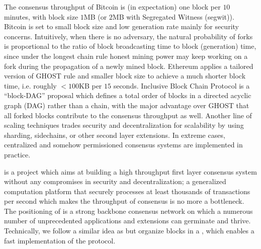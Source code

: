 \documentclass[fleqn,10pt]{SelfArx} %
\begin{document}
The consensus throughput of Bitcoin is (in expectation) one block per $10$ minutes, with block size $1$MB (or $2$MB with Segregated Witness (segwit)).
Bitcoin is set to small block size and low generation rate mainly for security concerns.
Intuitively, when there is no adversary, the natural probability of forks is proportional to the ratio of  block broadcasting time to block (generation) time,
since under the longest chain rule honest mining power may keep working on a fork during the propagation of a newly mined block.
Ethereum applies a tailored version of GHOST rule \cite{GHOST} and smaller block size to achieve a much shorter block time, i.e. roughly $<100$KB per $15$ seconds.
Inclusive Block Chain Protocol \cite{Inclusive} is a ``block-DAG'' proposal which defines a total order of blocks in a directed acyclic graph (DAG) rather than a chain, with the major advantage over GHOST that all forked blocks contribute to the consensus throughput as well. 
Another line of scaling techniques trades security and decentralization for scalability by using sharding, sidechains, or other second layer extensions.
In extreme cases, centralized and somehow permissioned consensus systems are implemented in practice.


{\name} is a project which aims at building a high throughput first layer consensus system without any compromises in security and decentralization; a generalized computation platform that securely processes at least thousands of transactions per second which makes the  throughput of consensus is no more a bottleneck.
The positioning of {\name} is a strong backbone consensus network on which a numerous number of unprecedented applications and extensions can germinate and thrive.
Technically, we follow a similar idea as \cite{Inclusive} but organize blocks in a \tg, 
which enables a fast implementation of the {\name} protocol.







\end{document}
